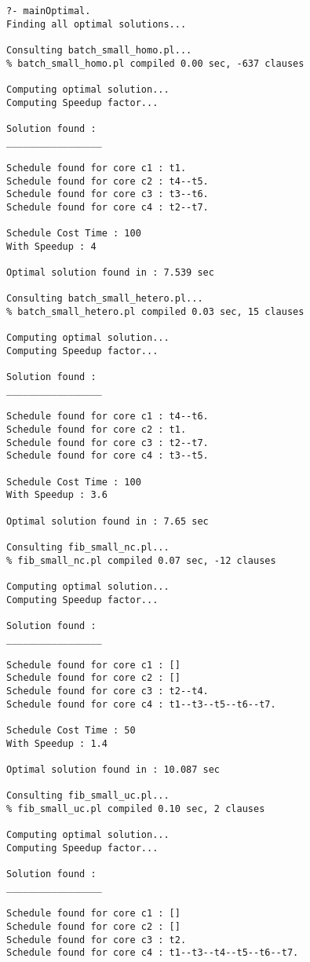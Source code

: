 \documentclass[11pt, a4paper, margin = 1.3cm]{article}
\begin{document}
\begin{verbatim}
?- mainOptimal.             
Finding all optimal solutions...

Consulting batch_small_homo.pl...
% batch_small_homo.pl compiled 0.00 sec, -637 clauses

Computing optimal solution...
Computing Speedup factor...

Solution found : 
_________________

Schedule found for core c1 : t1.
Schedule found for core c2 : t4--t5.
Schedule found for core c3 : t3--t6.
Schedule found for core c4 : t2--t7.

Schedule Cost Time : 100
With Speedup : 4

Optimal solution found in : 7.539 sec

Consulting batch_small_hetero.pl...
% batch_small_hetero.pl compiled 0.03 sec, 15 clauses

Computing optimal solution...
Computing Speedup factor...

Solution found : 
_________________

Schedule found for core c1 : t4--t6.
Schedule found for core c2 : t1.
Schedule found for core c3 : t2--t7.
Schedule found for core c4 : t3--t5.

Schedule Cost Time : 100
With Speedup : 3.6

Optimal solution found in : 7.65 sec

Consulting fib_small_nc.pl...
% fib_small_nc.pl compiled 0.07 sec, -12 clauses

Computing optimal solution...
Computing Speedup factor...

Solution found : 
_________________

Schedule found for core c1 : []
Schedule found for core c2 : []
Schedule found for core c3 : t2--t4.
Schedule found for core c4 : t1--t3--t5--t6--t7.

Schedule Cost Time : 50
With Speedup : 1.4

Optimal solution found in : 10.087 sec

Consulting fib_small_uc.pl...
% fib_small_uc.pl compiled 0.10 sec, 2 clauses

Computing optimal solution...
Computing Speedup factor...

Solution found : 
_________________

Schedule found for core c1 : []
Schedule found for core c2 : []
Schedule found for core c3 : t2.
Schedule found for core c4 : t1--t3--t4--t5--t6--t7.


\end{verbatim}
\end{document}
